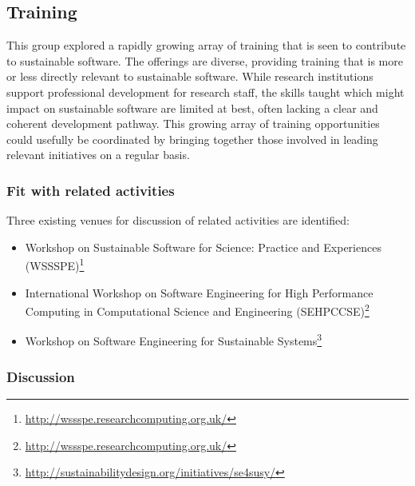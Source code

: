 \subsection{Training}


This group explored a rapidly growing array of training that is seen to
contribute to sustainable software. The offerings are diverse, providing
training that is more or less directly relevant to sustainable software. While
research institutions support professional development for research staff, the
skills taught which might impact on sustainable software are limited at best,
often lacking a clear and coherent development pathway. This growing array of
training opportunities could usefully be coordinated by bringing together those
involved in leading relevant initiatives on a regular basis.

\subsubsection{Fit with related activities} Three existing venues for discussion
of related activities are identified:

\begin{itemize}

\item Workshop on Sustainable Software for Science: Practice and
Experiences (WSSSPE)\footnote{\url{http://wssspe.researchcomputing.org.uk/}}

\item International Workshop on Software Engineering for High
Performance Computing in Computational Science and
Engineering (SEHPCCSE)\footnote{\url{http://wssspe.researchcomputing.org.uk/}}

\item Workshop on Software Engineering for Sustainable Systems\footnote{\url{http://sustainabilitydesign.org/initiatives/se4susy/}}

\end{itemize}

\subsubsection{Discussion}

